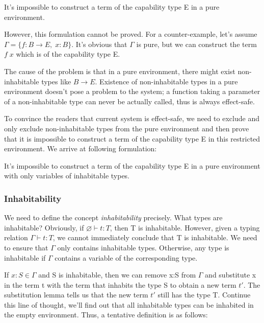 \begin{definition}
  It's impossible to construct a term of the capability type E in a
  pure environment.
\end{definition}

However, this formulation cannot be proved.  For a counter-example,
let's assume $\Gamma = \{f: B \to E, \; x: B\}$. It's obvious that
$\Gamma$ is pure, but we can construct the term $f \; x$ which is of
the capability type E.

The cause of the problem is that in a pure environment, there might
exist non-inhabitable types like $B \to E$.  Existence of
non-inhabitable types in a pure environment doesn't pose a problem to
the system; a function taking a parameter of a non-inhabitable type can
never be actually called, thus is always effect-safe.

To convince the readers that current system is effect-safe, we need to
exclude and only exclude non-inhabitable types from the pure
environment and then prove that it is impossible to construct a term
of the capability type E in this restricted environment. We arrive at
following formulation:

\begin{definition}
  It's impossible to construct a term of the capability type E in a
  pure environment with only variables of inhabitable types.
\end{definition}

\subsubsection{Inhabitability}

We need to define the concept \emph{inhabitability} precisely. What
types are inhabitable? Obviously, if $\varnothing \vdash t: T$, then T
is inhabitable.  However, given a typing relation
$\Gamma \vdash t: T$, we cannot immediately conclude that T is
inhabitable. We need to ensure that $\Gamma$ only contains inhabitable
types. Otherwise, any type is inhabitable if $\Gamma$ contains a
variable of the corresponding type.

If $x:S \in \Gamma$ and S is inhabitable, then we can remove x:S from
$\Gamma$ and substitute x in the term t with the term that inhabits
the type S to obtain a new term $t'$. The substitution lemma tells us
that the new term $t'$ still has the type T. Continue this line of
thought, we'll find out that all inhabitable types can be inhabited in
the empty environment. Thus, a tentative definition is as follows:

